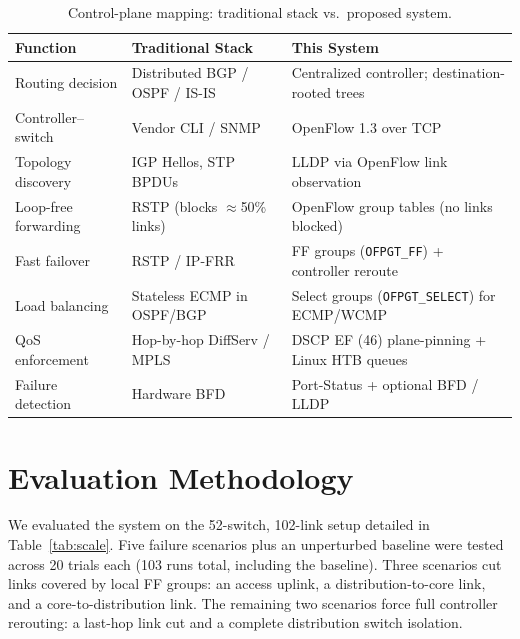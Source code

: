 \documentclass[conference]{IEEEtran}
\begin{document}
\begin{table}[t]
\caption{Control-plane mapping: traditional stack vs.\ proposed system.}
\label{tab:compare}
\centering
\footnotesize
\begin{tabular}{@{}p{1.7cm}p{2.5cm}p{2.8cm}@{}}
\toprule
Function & Traditional Stack & This System \\
\midrule
Routing decision & Distributed BGP / OSPF / IS-IS & Centralized controller; destination-rooted trees \\
Controller--switch & Vendor CLI / SNMP & OpenFlow 1.3 over TCP \\
Topology discovery & IGP Hellos, STP BPDUs & LLDP via OpenFlow link observation \\
Loop-free forwarding & RSTP (blocks $\approx$50\% links) & OpenFlow group tables (no links blocked) \\
Fast failover & RSTP / IP-FRR & FF groups (\texttt{OFPGT\_FF}) + controller reroute \\
Load balancing & Stateless ECMP in OSPF/BGP & Select groups (\texttt{OFPGT\_SELECT}) for ECMP/WCMP \\
QoS enforcement & Hop-by-hop DiffServ / MPLS & DSCP EF (46) plane-pinning + Linux HTB queues \\
Failure detection & Hardware BFD & Port-Status + optional BFD / LLDP \\
\bottomrule
\end{tabular}
\end{table}

\section{Evaluation Methodology}\label{sec:method}
We evaluated the system on the 52-switch, 102-link setup detailed in Table~\ref{tab:scale}. Five failure scenarios plus an unperturbed baseline were tested across 20 trials each (103 runs total, including the baseline). Three scenarios cut links covered by local FF groups: an access uplink, a distribution-to-core link, and a core-to-distribution link. The remaining two scenarios force full controller rerouting: a last-hop link cut and a complete distribution switch isolation.
\end{document}

